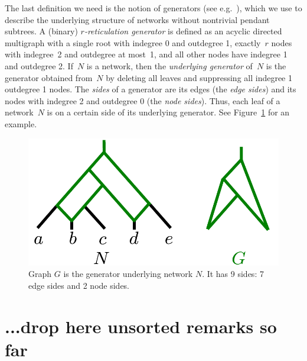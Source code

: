 

The last definition we need is the notion of generators (see e.g.~\cite{KelkScornavacca2011}), which we use to describe the underlying structure of networks without nontrivial pendant subtrees. A (binary) \emph{$r$-reticulation generator} is defined as an acyclic directed multigraph with a single root with indegree 0 and outdegree 1, exactly~$r$ nodes with indegree~2 and outdegree at most~1, and all other nodes have indegree 1 and outdegree 2. If~$N$ is a network, then the \emph{underlying generator} of~$N$ is the generator obtained from~$N$ by deleting all leaves and suppressing all indegree 1 outdegree 1 nodes. The \emph{sides} of a generator are its edges (the \emph{edge sides}) and its nodes with indegree 2 and outdegree 0 (the \emph{node sides}). Thus, each leaf of a network~$N$ is on a certain side of its underlying generator. See Figure~\ref{fig:generator} for an example.

\begin{figure}[h]
 \centering
  \includegraphics[scale=.5]{../figs/ch4/generator.pdf}
 \caption{Graph $G$ is the generator underlying network $N$. It has 9 sides: 7 edge sides and 2 node sides.}
 \label{fig:generator}
\end{figure}




\section{...drop here unsorted remarks so far}

